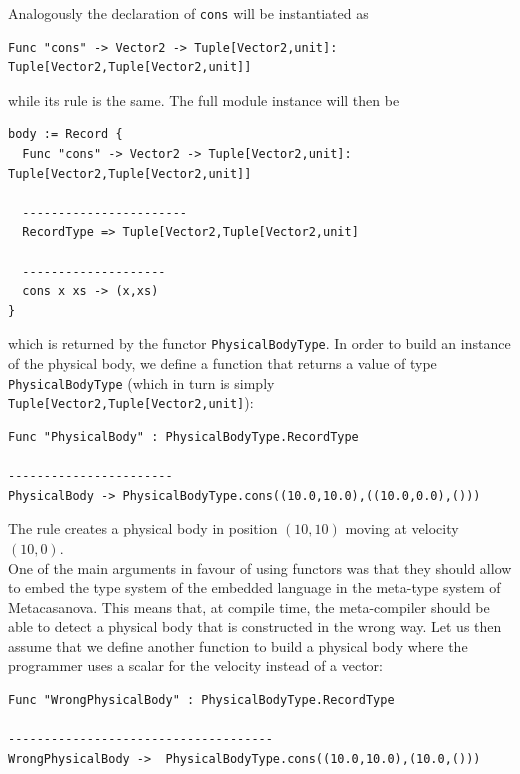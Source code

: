 \noindent
Analogously the declaration of \texttt{cons} will be instantiated as

\begin{lstlisting}
Func "cons" -> Vector2 -> Tuple[Vector2,unit]: Tuple[Vector2,Tuple[Vector2,unit]]
\end{lstlisting}

\noindent
while its rule is the same. The full module instance will then be

\begin{lstlisting}
body := Record {
  Func "cons" -> Vector2 -> Tuple[Vector2,unit]: Tuple[Vector2,Tuple[Vector2,unit]]
  
  -----------------------
  RecordType => Tuple[Vector2,Tuple[Vector2,unit]
  
  --------------------
  cons x xs -> (x,xs)
}
\end{lstlisting}

\noindent
which is returned by the functor \texttt{PhysicalBodyType}. In order to build an instance of the physical body, we define a function that returns a value of type \texttt{PhysicalBodyType} (which in turn is simply\\ \texttt{Tuple[Vector2,Tuple[Vector2,unit]}):

\begin{lstlisting}
Func "PhysicalBody" : PhysicalBodyType.RecordType

-----------------------
PhysicalBody -> PhysicalBodyType.cons((10.0,10.0),((10.0,0.0),()))
\end{lstlisting}

\noindent
The rule creates a physical body in position $(10,10)$ moving at velocity $(10,0)$.\\

One of the main arguments in favour of using functors was that they should allow to embed the type system of the embedded language in the meta-type system of Metacasanova. This means that, at compile time, the meta-compiler should be able to detect a physical body that is constructed in the wrong way. Let us then assume that we define another function to build a physical body where the programmer uses a scalar for the velocity instead of a vector:

\begin{lstlisting}
Func "WrongPhysicalBody" : PhysicalBodyType.RecordType

-------------------------------------
WrongPhysicalBody ->  PhysicalBodyType.cons((10.0,10.0),(10.0,()))
\end{lstlisting}

